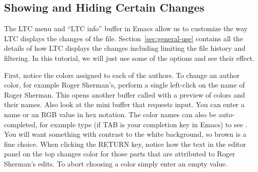 \subsection{Showing and Hiding Certain Changes}

The LTC menu and ``LTC info'' buffer in Emacs allow us to customize the way LTC displays the changes of the file.  Section~\ref{sec:general-use} contains all the details of how LTC displays the changes including limiting the file history and filtering.  In this tutorial, we will just use some of the options and see their effect.

First, notice the colors assigned to each of the authors.  To change an author color, for example Roger Sherman's,  perform a single left-click on the name of Roger Sherman.  This opens another buffer called  with a preview of colors and their names.  Also look at the mini buffer that requests input.   You can enter a name or an RGB value in hex notation.  The color names can also be auto-completed, for example type  (if TAB is your completion key in Emacs) to see .  You will want something with contrast to the white background, so brown is a fine choice.  When clicking the RETURN key, notice how the text in the editor panel on the top changes color for those parts that are attributed to Roger Sherman's edits.  To abort choosing a color simply enter an empty value.

